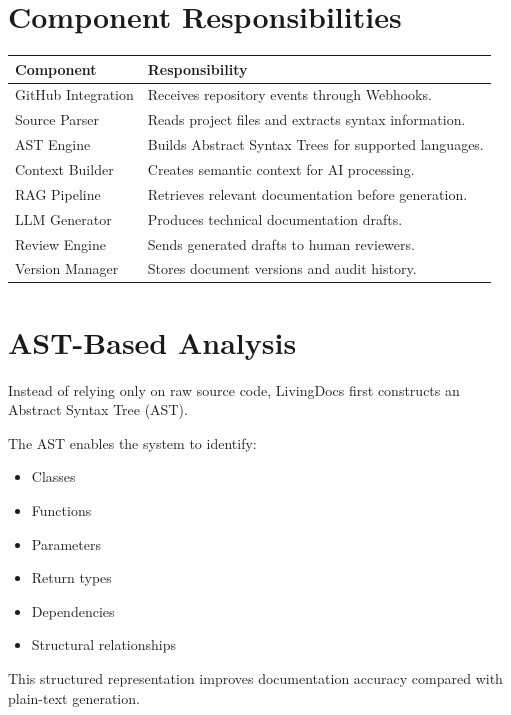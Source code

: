 
\section{Component Responsibilities}

\begin{longtable}{|p{4cm}|p{8cm}|}
\hline
\textbf{Component} & \textbf{Responsibility}\\
\hline
GitHub Integration & Receives repository events through Webhooks.\\
\hline
Source Parser & Reads project files and extracts syntax information.\\
\hline
AST Engine & Builds Abstract Syntax Trees for supported languages.\\
\hline
Context Builder & Creates semantic context for AI processing.\\
\hline
RAG Pipeline & Retrieves relevant documentation before generation.\\
\hline
LLM Generator & Produces technical documentation drafts.\\
\hline
Review Engine & Sends generated drafts to human reviewers.\\
\hline
Version Manager & Stores document versions and audit history.\\
\hline
\end{longtable}


\section{AST-Based Analysis}

Instead of relying only on raw source code, LivingDocs first constructs an Abstract Syntax Tree (AST).

The AST enables the system to identify:

\begin{itemize}
    \item Classes
    \item Functions
    \item Parameters
    \item Return types
    \item Dependencies
    \item Structural relationships
\end{itemize}

This structured representation improves documentation accuracy compared with plain-text generation.

